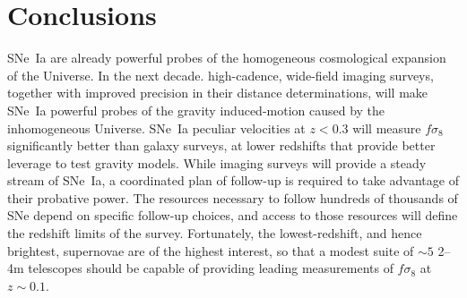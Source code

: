 \documentclass{aastex62}   	%
\begin{document}
\section{Conclusions}
SNe~Ia are already powerful probes of the homogeneous cosmological expansion of the Universe.  In the next decade.
high-cadence, wide-field imaging surveys, together with improved precision in their distance determinations, will make SNe~Ia powerful probes
of the gravity induced-motion caused by the inhomogeneous Universe.  SNe~Ia peculiar velocities at $z<0.3$ will measure $f \sigma_8$ significantly better
than galaxy surveys, at lower redshifts that provide better leverage to test gravity models.
While imaging surveys will provide a steady stream of SNe~Ia, a coordinated plan of follow-up is required to take advantage of
their probative power.  The resources necessary to follow hundreds of thousands of SNe depend on specific follow-up choices, and 
access to those resources will define the redshift limits of the survey.  Fortunately, the lowest-redshift, and hence brightest, supernovae
are of the highest interest, so that a modest suite of $\sim 5$ 2--4m telescopes should be capable of providing leading measurements of
$f\sigma_8$ at $z\sim 0.1$.
\end{document}
